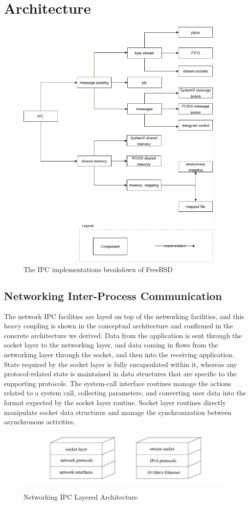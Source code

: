 \documentclass[12pt, dvipsnames, a4paper]{article}
\begin{document}
\section{Architecture}
\begin{figure}[!htb]
	\center
	\includegraphics[width = 290pt]{assets/ipc-implementations.png}
	\caption{The IPC implementations breakdown of FreeBSD}
\end{figure}
\subsection{Networking Inter-Process Communication}
The network IPC facilities are layed on top of the networking facilities, and this heavy coupling is shown in the conceptual architecture and confirmed in the concrete architecture we derived. Data from the application is sent through the socket layer to the networking layer, and data coming in flows from the networking layer through the socket, and then into the receiving application.  State required by the socket layer is fully encapsulated within it, whereas any protocol-related state is maintained in data structures that are specific to the supporting protocols. The system-call interface routines manage the actions related to a system call, collecting parameters, and converting user data into the format expected by the socket layer routine. Socket layer routines directly manipulate socket data structures and manage the synchronization between asynchronous activities.
\begin{figure}[!htb]
	\centering
	\includegraphics[width=500pt]{assets/IPC_Net_ARCH.png}
	\caption{Networking IPC Layered Architecture}\cite{mckusick}
\end{figure}
\end{document}
